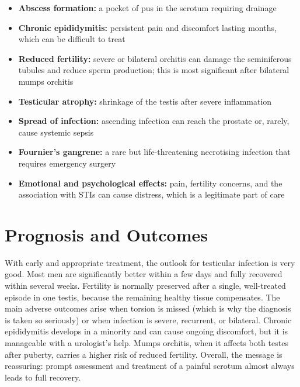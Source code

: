 \begin{itemize}
    \item \textbf{Abscess formation:} a pocket of pus in the scrotum requiring drainage
    \item \textbf{Chronic epididymitis:} persistent pain and discomfort lasting months, which can be difficult to treat
    \item \textbf{Reduced fertility:} severe or bilateral orchitis can damage the seminiferous tubules and reduce sperm production; this is most significant after bilateral mumps orchitis
    \item \textbf{Testicular atrophy:} shrinkage of the testis after severe inflammation
    \item \textbf{Spread of infection:} ascending infection can reach the prostate or, rarely, cause systemic sepsis
    \item \textbf{Fournier's gangrene:} a rare but life-threatening necrotising infection that requires emergency surgery
    \item \textbf{Emotional and psychological effects:} pain, fertility concerns, and the association with STIs can cause distress, which is a legitimate part of care
\end{itemize}

\section*{Prognosis and Outcomes}
With early and appropriate treatment, the outlook for testicular infection is very good. Most men are significantly better within a few days and fully recovered within several weeks. Fertility is normally preserved after a single, well-treated episode in one testis, because the remaining healthy tissue compensates. The main adverse outcomes arise when torsion is missed (which is why the diagnosis is taken so seriously) or when infection is severe, recurrent, or bilateral. Chronic epididymitis develops in a minority and can cause ongoing discomfort, but it is manageable with a urologist's help. Mumps orchitis, when it affects both testes after puberty, carries a higher risk of reduced fertility. Overall, the message is reassuring: prompt assessment and treatment of a painful scrotum almost always leads to full recovery.

